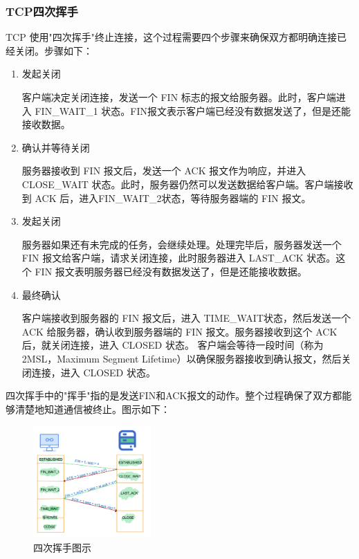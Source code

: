 \documentclass[UTF8,a4paper,10pt]{ctexart}
\begin{document}
\subsubsection{TCP四次挥手}
TCP 使用"四次挥手"终止连接，这个过程需要四个步骤来确保双方都明确连接已经关闭。步骤如下：
\begin{enumerate}

\item 发起关闭\par
客户端决定关闭连接，发送一个 FIN 标志的报文给服务器。此时，客户端进入 FIN\_WAIT\_1 状态。FIN报文表示客户端已经没有数据发送了，但是还能接收数据。

\item 确认并等待关闭\par
服务器接收到 FIN 报文后，发送一个 ACK 报文作为响应，并进入 CLOSE\_WAIT 状态。此时，服务器仍然可以发送数据给客户端。客户端接收到 ACK 后，进入FIN\_WAIT\_2状态，等待服务器端的 FIN 报文。

\item 发起关闭\par
服务器如果还有未完成的任务，会继续处理。处理完毕后，服务器发送一个 FIN 报文给客户端，请求关闭连接，此时服务器进入 LAST\_ACK 状态。这个 FIN 报文表明服务器已经没有数据发送了，但是还能接收数据。
\item 最终确认\par
客户端接收到服务器的 FIN 报文后，进入 TIME\_WAIT状态，然后发送一个 ACK 给服务器，确认收到服务器端的 FIN 报文。服务器接收到这个 ACK 后，就关闭连接，进入 CLOSED 状态。
客户端会等待一段时间（称为2MSL，Maximum Segment Lifetime）以确保服务器接收到确认报文，然后关闭连接，进入  CLOSED 状态。
\end{enumerate}
四次挥手中的"挥手"指的是发送FIN和ACK报文的动作。整个过程确保了双方都能够清楚地知道通信被终止。图示如下：
\begin{figure}[H]
    \centering
\includegraphics[width=0.4\textwidth]{img/四次挥手图示.png}
    \caption{四次挥手图示}
\end{figure}


\vspace{1cm}
\end{document}
